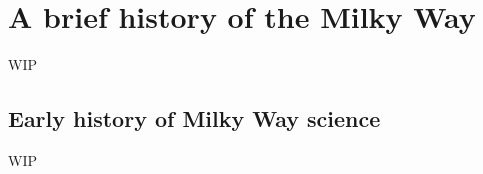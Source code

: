 
\section{A brief history of the Milky Way}

WIP


\subsection{Early history of Milky Way science}

WIP



